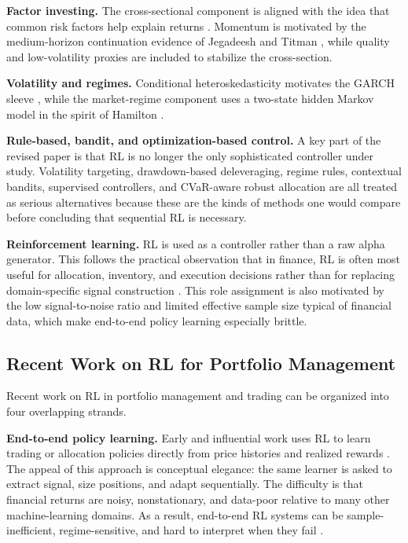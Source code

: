 \documentclass[11pt]{article}
\begin{document}
\textbf{Factor investing.} The cross-sectional component is aligned with the idea
that common risk factors help explain returns \cite{fama1993}. Momentum is
motivated by the medium-horizon continuation evidence of Jegadeesh and Titman
\cite{jegadeesh1993}, while quality and low-volatility proxies are included to
stabilize the cross-section.

\textbf{Volatility and regimes.} Conditional heteroskedasticity motivates the
GARCH sleeve \cite{engle1982,bollerslev1986}, while the market-regime component
uses a two-state hidden Markov model in the spirit of Hamilton \cite{hamilton1989}.

\textbf{Rule-based, bandit, and optimization-based control.} A key part of the
revised paper is that RL is no longer the only sophisticated controller under
study. Volatility targeting, drawdown-based deleveraging, regime rules,
contextual bandits, supervised controllers, and CVaR-aware robust allocation
are all treated as serious alternatives because these are the kinds of methods
one would compare before concluding that sequential RL is necessary.

\textbf{Reinforcement learning.} RL is used as a controller rather than a raw
alpha generator. This follows the practical observation that in finance, RL is
often most useful for allocation, inventory, and execution decisions rather than
for replacing domain-specific signal construction \cite{sutton2018,almgren2000}.
This role assignment is also motivated by the low signal-to-noise ratio and
limited effective sample size typical of financial data, which make end-to-end
policy learning especially brittle.

\subsection{Recent Work on RL for Portfolio Management}

Recent work on RL in portfolio management and trading can be organized into four
overlapping strands.

\textbf{End-to-end policy learning.} Early and influential work uses RL to learn
trading or allocation policies directly from price histories and realized
rewards \cite{moody2001,deng2017,jiang2017,zhang2020,cong2021,pacheco2023}. The appeal of
this approach is conceptual elegance: the same learner is asked to extract
signal, size positions, and adapt sequentially. The difficulty is that
financial returns are noisy, nonstationary, and data-poor relative to many
other machine-learning domains. As a result, end-to-end RL systems can be
sample-inefficient, regime-sensitive, and hard to interpret when they fail
\cite{gu2020,kolm2019,jander2025}.
\end{document}
